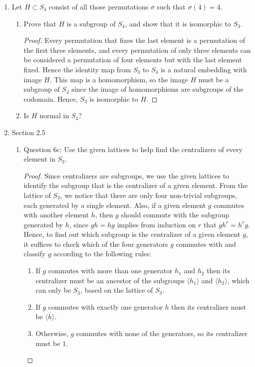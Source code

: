 \documentclass{article}
\begin{document}
\begin{enumerate}
  \item Let $H\subset S_4$ consist of all those permutations $\sigma$ such
    that $\sigma(4)=4$.

    \begin{enumerate}
      \item Prove that $H$ is a subgroup of $S_4$, and show that it is
        isomorphic to $S_3$.
        \begin{proof}
          Every permutation that fixes the last element is a permutation of
          the first three elements, and every permutation of only three
          elements can be considered a permutation of four elements but
          with the last element fixed. Hence the identity map from $S_3$
          to $S_4$ is a natural embedding with image $H$. This map is a
          homomorphism, so the image $H$ must be a subgroup of $S_4$ since
          the image of homomorphisms are subgroups of the codomain. Hence,
          $S_3$ is isomorphic to $H$.
        \end{proof}

      \item Is $H$ normal in $S_4$?
    \end{enumerate}

  \item Section 2.5
    \begin{enumerate}
      \item Question 6c: Use the given lattices to help find the
        centralizers of every element in $S_3$.
        \begin{proof}
          Since centralizers are subgroups, we use the given lattices to
          identify the subgroup that is the centralizer of a given element.
          From the lattice of $S_3$, we notice that there are only four
          non-trivial subgroups, each generated by a single element. Also,
          if a given element $g$ commutes with another element $h$, then
          $g$ should commute with the subgroup generated by $h$, since
          $gh=hg$ implies from induction on $r$ that $gh^r=h^rg$. Hence, to
          find out which subgroup is the centralizer of a given element
          $g$, it suffices to check which of the four generators $g$
          commutes with and classify $g$ according to the following rules:
          \begin{enumerate}
            \item If $g$ commutes with more than one generator $h_1$ and
              $h_2$ then its centralizer must be an ancestor of the
              subgroups $\langle h_1\rangle$ and $\langle h_2\rangle$,
              which can only be $S_3$, based on the lattice of $S_3$.
            \item If $g$ commutes with exactly one generator $h$ then its
              centralizer must be $\langle h\rangle$.
            \item Otherwise, $g$ commutes with none of the generators, so
              its centralizer must be $1$.
          \end{enumerate}


\end{proof}
\end{enumerate}
\end{enumerate}
\end{document}
